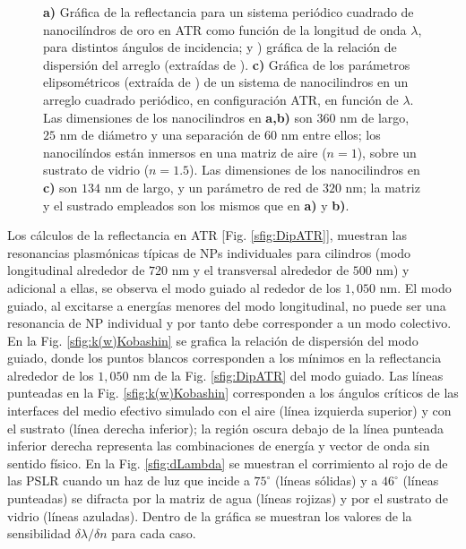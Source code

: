 \begin{figure}[h!]
		\caption{\textbf{a)} Gráfica de la reflectancia  para un sistema periódico cuadrado de nanocilíndros de oro en ATR como función de la longitud de onda $\lambda$, para distintos ángulos de incidencia; y ) gráfica de la relación de dispersión  del arreglo  (extraídas de \cite{kabashin2009plasmonic}).  \textbf{c)} Gráfica de los parámetros elipsométricos (extraída de \cite{danilov2018ultra}) de un sistema de nanocilindros en un arreglo cuadrado periódico, en configuración ATR, en función de $\lambda$.  Las dimensiones de los nanocilindros en \textbf{a,b)} son $360$ nm de largo, $25$ nm de diámetro y una separación de $60$ nm entre ellos; los nanocilíndos están inmersos en una matriz de aire ($n=1$), sobre un sustrato de vidrio ($n=1.5$).  Las dimensiones de los nanocilindros en \textbf{c)} son $134$ nm de largo, y un parámetro de red de $320$ nm; la matriz y el sustrado empleados son los mismos que en \textbf{a)} y \textbf{b)}. }\label{fig:GraphsPapers}
	\end{figure}

Los cálculos de la reflectancia en ATR [Fig. \ref{sfig:DipATR}], muestran las resonancias plasmónicas típicas de NPs individuales para cilindros (modo longitudinal alrededor de $720$ nm y el transversal alrededor de $500$ nm) y adicional a ellas, se observa el modo guiado al rededor de los $1,050$ nm.  El modo guiado, al excitarse a energías menores del modo longitudinal, no puede ser una resonancia de NP individual y por tanto debe corresponder a un modo colectivo. En la Fig.  \ref{sfig:k(w)Kobashin} se grafica la relación de dispersión del modo guiado, donde los puntos blancos corresponden a los mínimos en la reflectancia alrededor de los $1,050$ nm de la Fig.  \ref{sfig:DipATR} del modo guiado.  Las líneas punteadas en la Fig.   \ref{sfig:k(w)Kobashin} corresponden a los ángulos críticos de las interfaces del medio efectivo simulado con el aire (línea izquierda superior) y con el sustrato (línea derecha inferior); la región oscura debajo de la línea punteada inferior derecha representa las combinaciones de energía y vector de onda sin sentido físico.  En la Fig.  \ref{sfig:dLambda} se muestran el corrimiento al rojo de de las PSLR cuando un haz de luz que incide a $75^\circ$ (líneas sólidas) y a $46^\circ$ (líneas punteadas) se difracta por la matriz de agua (líneas rojizas) y por el sustrato de vidrio (líneas azuladas). Dentro de la gráfica se muestran los valores de la sensibilidad $\delta \lambda /\delta n$ para cada caso.  



